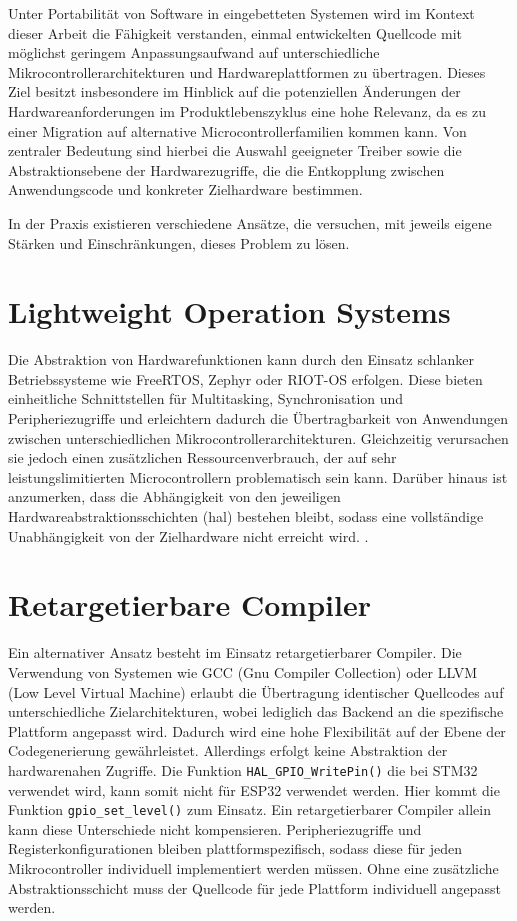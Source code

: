 
Unter Portabilität von Software in eingebetteten Systemen wird im Kontext dieser Arbeit die Fähigkeit verstanden, einmal entwickelten Quellcode mit möglichst geringem Anpassungsaufwand auf unterschiedliche Mikrocontrollerarchitekturen und Hardwareplattformen zu übertragen. 
Dieses Ziel besitzt insbesondere im Hinblick auf die potenziellen Änderungen der Hardwareanforderungen im Produktlebenszyklus eine hohe Relevanz, da es zu einer Migration auf alternative Microcontrollerfamilien kommen kann.
Von zentraler Bedeutung sind hierbei die Auswahl geeigneter Treiber sowie die Abstraktionsebene der Hardwarezugriffe, die die Entkopplung zwischen Anwendungscode und konkreter Zielhardware bestimmen.

In der Praxis existieren verschiedene Ansätze, die versuchen, mit jeweils eigene Stärken und Einschränkungen, dieses Problem zu lösen.

\section{Lightweight Operation Systems}
Die Abstraktion von Hardwarefunktionen kann durch den Einsatz schlanker Betriebssysteme wie FreeRTOS, Zephyr oder RIOT-OS erfolgen. 
Diese bieten einheitliche Schnittstellen für Multitasking, Synchronisation und Peripheriezugriffe und erleichtern dadurch die Übertragbarkeit von Anwendungen zwischen unterschiedlichen Mikrocontrollerarchitekturen. 
Gleichzeitig verursachen sie jedoch einen zusätzlichen Ressourcenverbrauch, der auf sehr leistungslimitierten Microcontrollern problematisch sein kann.
 Darüber hinaus ist anzumerken, dass die Abhängigkeit von den jeweiligen Hardwareabstraktionsschichten (\gls{hal}) bestehen bleibt, sodass eine vollständige Unabhängigkeit von der Zielhardware nicht erreicht wird. \cite{freertos}\cite{zephyr}\cite{riot}.  


\section{Retargetierbare Compiler}
Ein alternativer Ansatz besteht im Einsatz retargetierbarer Compiler. 
Die Verwendung von Systemen wie GCC (Gnu Compiler Collection) oder LLVM (Low Level Virtual Machine) erlaubt die Übertragung identischer Quellcodes auf unterschiedliche Zielarchitekturen, wobei lediglich das Backend an die spezifische Plattform angepasst wird.
Dadurch wird eine hohe Flexibilität auf der Ebene der Codegenerierung gewährleistet. 
Allerdings erfolgt keine Abstraktion der hardwarenahen Zugriffe.
Die Funktion \texttt{HAL\_GPIO\_WritePin()} die bei STM32 verwendet wird, kann somit nicht für ESP32 verwendet werden.
Hier kommt die Funktion \texttt{gpio\_set\_level()} zum Einsatz.
Ein retargetierbarer Compiler allein kann diese Unterschiede nicht kompensieren. 
Peripheriezugriffe und Registerkonfigurationen bleiben plattformspezifisch, sodass diese für jeden Mikrocontroller individuell implementiert werden müssen. 
Ohne eine zusätzliche Abstraktionsschicht muss der Quellcode für jede Plattform individuell angepasst werden.\cite{gccint}\cite{llvm}\cite{johnson1975}

